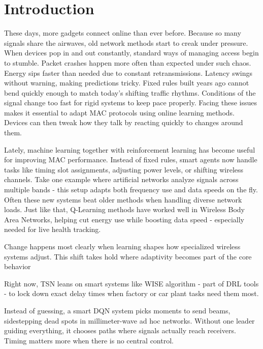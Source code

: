 \documentclass[a4paper,fleqn]{cas-dc}
\numberwithin{equation}{section}
\begin{document}
\maketitle



\section{Introduction}
These days, more gadgets connect online than ever before. Because so many signals share the airwaves, old network methods start to creak under pressure. When devices pop in and out constantly, standard ways of managing access begin to stumble. Packet crashes happen more often than expected under such chaos. Energy sips faster than needed due to constant retransmissions. Latency swings without warning, making predictions tricky. Fixed rules built years ago cannot bend quickly enough to match today’s shifting traffic rhythms. Conditions of the signal change too fast for rigid systems to keep pace properly. Facing these issues makes it essential to adapt MAC protocols using online learning methods. Devices can then tweak how they talk by reacting quickly to changes around them.

Lately, machine learning together with reinforcement learning has become useful for improving MAC performance. Instead of fixed rules, smart agents now handle tasks like timing slot assignments, adjusting power levels, or shifting wireless channels. Take one example where artificial networks analyze signals across multiple bands - this setup adapts both frequency use and data speeds on the fly. Often these new systems beat older methods when handling diverse network loads. Just like that, Q-Learning methods have worked well in Wireless Body Area Networks, helping cut energy use while boosting data speed - especially needed for live health tracking.

Change happens most clearly when learning shapes how specialized wireless systems adjust. This shift takes hold where adaptivity becomes part of the core behavior

Right now, TSN leans on smart systems like WISE algorithm - part of DRL tools - to lock down exact delay times when factory or car plant tasks need them most.

Instead of guessing, a smart DQN system picks moments to send beams, sidestepping dead spots in millimeter-wave ad hoc networks. Without one leader guiding everything, it chooses paths where signals actually reach receivers. Timing matters more when there is no central control.
\end{document}
